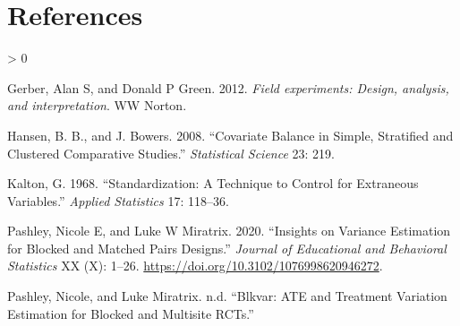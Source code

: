 \documentclass[
]{article}
\newlength{\cslhangindent}
\newenvironment{CSLReferences}[2] %
 {%
  \setlength{\parindent}{0pt}
  \ifodd #1 \everypar{\setlength{\hangindent}{\cslhangindent}}\ignorespaces\fi
  \ifnum #2 > 0
  \setlength{\parskip}{#2\baselineskip}
  \fi
 }%
 {}
\begin{document}
\hypertarget{references}{%
\section*{References}\label{references}}

\hypertarget{refs}{}
\begin{CSLReferences}{1}{0}
\leavevmode\hypertarget{ref-gerber2012field}{}%
Gerber, Alan S, and Donald P Green. 2012. \emph{{Field experiments: Design, analysis, and interpretation}}. WW Norton.

\leavevmode\hypertarget{ref-hansen2008cbs}{}%
Hansen, B. B., and J. Bowers. 2008. {``Covariate Balance in Simple, Stratified and Clustered Comparative Studies.''} \emph{Statistical Science} 23: 219.

\leavevmode\hypertarget{ref-kalton1968}{}%
Kalton, G. 1968. {``Standardization: {A} Technique to Control for Extraneous Variables.''} \emph{Applied Statistics} 17: 118--36.

\leavevmode\hypertarget{ref-pashley2020blocked}{}%
Pashley, Nicole E, and Luke W Miratrix. 2020. {``Insights on Variance Estimation for Blocked and Matched Pairs Designs.''} \emph{Journal of Educational and Behavioral Statistics} XX (X): 1--26. \url{https://doi.org/10.3102/1076998620946272}.

\leavevmode\hypertarget{ref-pashley2020blkvar}{}%
Pashley, Nicole, and Luke Miratrix. n.d. {``Blkvar: ATE and Treatment Variation Estimation for Blocked and Multisite RCTs.''}

\end{CSLReferences}
\end{document}
